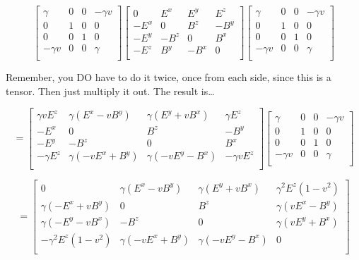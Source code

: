 \documentclass[landscape,letterpaper,10pt,english]{article}
\begin{document}
\[ \begin{bmatrix}
\gamma & 0 & 0 & -\gamma v \\
0 & 1 & 0 & 0 \\
0 & 0 & 1 & 0 \\
-\gamma v & 0 & 0 & \gamma \\
\end{bmatrix}  \begin{bmatrix}
0 & E^x & E^y & E^z \\
-E^x & 0 & B^z & -B^y \\
-E^y & -B^z & 0 & B^x \\
-E^z & B^y & -B^x & 0 \\
\end{bmatrix}\begin{bmatrix}
\gamma & 0 & 0 & -\gamma v \\
0 & 1 & 0 & 0 \\
0 & 0 & 1 & 0 \\
-\gamma v & 0 & 0 & \gamma \\
\end{bmatrix}
\]

Remember, you DO have to do it twice, once from each side, since this is
a tensor. Then just multiply it out. The result is\ldots{}

    \[ = \begin{bmatrix}
\gamma v E^z & \gamma (E^x - vB^y) & \gamma(E^y + vB^x) & \gamma E^z \\
-E^x & 0 & B^z & -B^y \\
-E^y & -B^z & 0 & B^x \\
-\gamma E^z & \gamma(-vE^x + B^y) & \gamma(-vE^y - B^x) & -\gamma v E^z \\
\end{bmatrix} \begin{bmatrix}
\gamma & 0 & 0 & -\gamma v \\
0 & 1 & 0 & 0 \\
0 & 0 & 1 & 0 \\
-\gamma v & 0 & 0 & \gamma \\
\end{bmatrix}\]

    \[ = \begin{bmatrix}
0 & \gamma (E^x - vB^y) & \gamma(E^y + vB^x) & \gamma^2 E^z (1-v^2) \\
\gamma(-E^x+vB^y) & 0 & B^z & \gamma(vE^x - B^y) \\
\gamma(-E^y - vB^x) & -B^z & 0 & \gamma(vE^y + B^x)\\
-\gamma^2 E^z (1-v^2) & \gamma(-vE^x + B^y) & \gamma(-vE^y - B^x) & 0 \\
\end{bmatrix}\]
\end{document}
